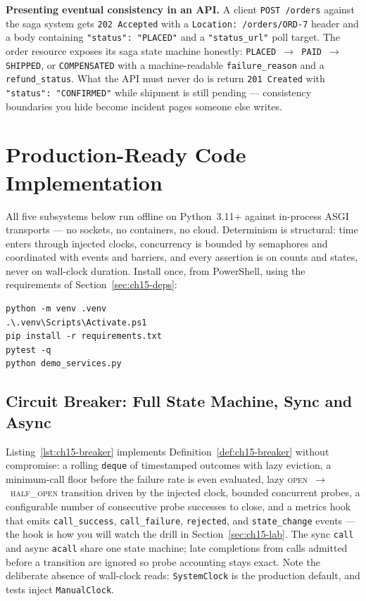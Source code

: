 \begin{examplebox}
\textbf{Presenting eventual consistency in an API.} A client
\texttt{POST /orders} against the saga system gets
\texttt{202 Accepted} with a \texttt{Location: /orders/ORD-7} header and a
body containing \texttt{"status": "PLACED"} and a
\texttt{"status\_url"} poll target. The order resource exposes its saga
state machine honestly: \texttt{PLACED $\to$ PAID $\to$ SHIPPED}, or
\texttt{COMPENSATED} with a machine-readable \texttt{failure\_reason} and a
\texttt{refund\_status}. What the API must never do is return
\texttt{201 Created} with \texttt{"status": "CONFIRMED"} while shipment is
still pending --- consistency boundaries you hide become incident pages
someone else writes.
\end{examplebox}

\section{Production-Ready Code Implementation}
\label{sec:ch15-code}

All five subsystems below run offline on Python~3.11+ against in-process
ASGI transports --- no sockets, no containers, no cloud. Determinism is
structural: time enters through injected clocks, concurrency is bounded by
semaphores and coordinated with events and barriers, and every assertion is
on counts and states, never on wall-clock duration. Install once, from
PowerShell, using the requirements of Section~\ref{sec:ch15-deps}:

\begin{verbatim}
python -m venv .venv
.\.venv\Scripts\Activate.ps1
pip install -r requirements.txt
pytest -q
python demo_services.py
\end{verbatim}

\subsection{Circuit Breaker: Full State Machine, Sync and Async}
\label{subsec:ch15-code-breaker}

Listing~\ref{lst:ch15-breaker} implements
Definition~\ref{def:ch15-breaker} without compromise: a rolling
\texttt{deque} of timestamped outcomes with lazy eviction, a minimum-call
floor before the failure rate is even evaluated, lazy
\textsc{open}~$\to$~\textsc{half\_open} transition driven by the injected
clock, bounded concurrent probes, a configurable number of consecutive probe
successes to close, and a metrics hook that emits \texttt{call\_success},
\texttt{call\_failure}, \texttt{rejected}, and \texttt{state\_change}
events --- the hook is how you will watch the drill in
Section~\ref{sec:ch15-lab}. The sync \texttt{call} and async \texttt{acall}
share one state machine; late completions from calls admitted before a
transition are ignored so probe accounting stays exact. Note the deliberate
absence of wall-clock reads: \texttt{SystemClock} is the production default,
and tests inject \texttt{ManualClock}.

